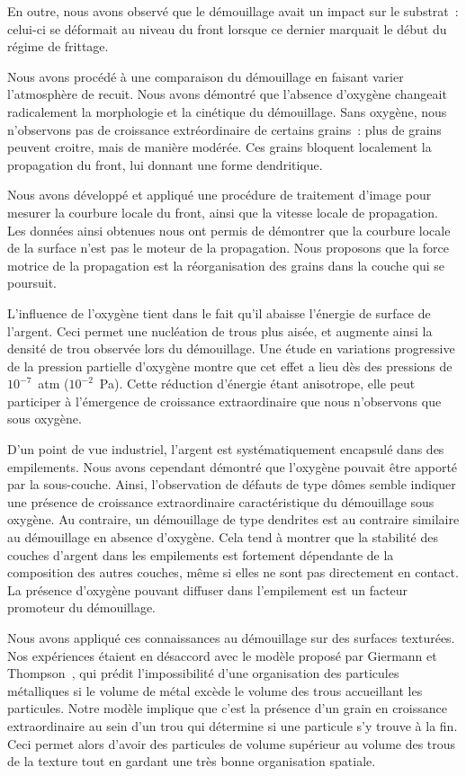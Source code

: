 En outre, nous avons observé que le démouillage avait un impact sur le substrat~: celui-ci se déformait au niveau du front lorsque ce dernier marquait le début du régime de frittage.\par 
Nous avons procédé à une comparaison du démouillage en faisant varier l'atmosphère de recuit. Nous avons démontré que l'absence d'oxygène changeait radicalement la morphologie et la cinétique du démouillage. Sans oxygène, nous n'observons pas de croissance extréordinaire de certains grains~: plus de grains peuvent croitre, mais de manière modérée. Ces grains bloquent localement la propagation du front, lui donnant une forme dendritique.\par 
Nous avons développé et appliqué une procédure de traitement d'image pour mesurer la courbure locale du front, ainsi que la vitesse locale de propagation. Les données ainsi obtenues nous ont permis de démontrer que la courbure locale de la surface n'est pas le moteur de la propagation. Nous proposons que la force motrice de la propagation est la réorganisation des grains dans la couche qui se poursuit. \par 
L'influence de l'oxygène tient dans le fait qu'il abaisse l'énergie de surface de l'argent. Ceci permet une nucléation de trous plus aisée, et augmente ainsi la densité de trou observée lors du démouillage. Une étude en variations progressive de la pression partielle d'oxygène montre que cet effet a lieu dès des pressions de $10^{-7}$~atm ($10^{-2}$~Pa). Cette réduction d'énergie étant anisotrope, elle peut participer à l'émergence de croissance extraordinaire que nous n'observons que sous oxygène.\par 
D'un point de vue industriel, l'argent est systématiquement encapsulé dans des empilements. Nous avons cependant démontré que l'oxygène pouvait être apporté par la sous-couche. Ainsi, l'observation de défauts de type \og dômes \fg{} semble indiquer une présence de croissance extraordinaire caractéristique du démouillage sous oxygène. Au contraire, un démouillage de type \og dendrites \fg{} est au contraire similaire au démouillage en absence d'oxygène. Cela tend à montrer que la stabilité des couches d'argent dans les empilements est fortement dépendante de la composition des autres couches, même si elles ne sont pas directement en contact. La présence d'oxygène pouvant diffuser dans l'empilement est un facteur promoteur du démouillage.\par 
Nous avons appliqué ces connaissances au démouillage sur des surfaces texturées. Nos expériences étaient en désaccord avec le modèle proposé par Giermann et Thompson~\cite{giermann2005solid, giermann2011requirements}, qui prédit l'impossibilité d'une organisation des particules métalliques si le volume de métal excède le volume des trous accueillant les particules. Notre modèle implique que c'est la présence d'un grain en croissance extraordinaire au sein d'un trou qui détermine si une particule s'y trouve à la fin. Ceci permet alors d'avoir des particules de volume supérieur au volume des trous de la texture tout en gardant une très bonne organisation spatiale.\par 
